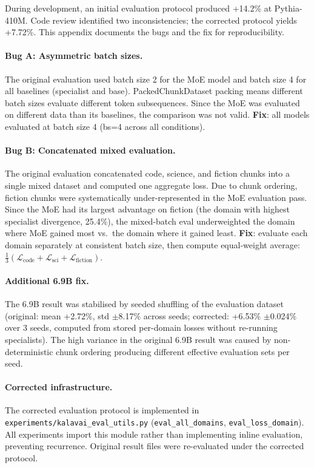 \documentclass{article}
\begin{document}
During development, an initial evaluation protocol produced +14.2\% at Pythia-410M. Code review identified two inconsistencies; the corrected protocol yields +7.72\%. This appendix documents the bugs and the fix for reproducibility.

\paragraph{Bug A: Asymmetric batch sizes.} The original evaluation used batch size 2 for the MoE model and batch size 4 for all baselines (specialist and base). PackedChunkDataset packing means different batch sizes evaluate different token subsequences. Since the MoE was evaluated on different data than its baselines, the comparison was not valid. \textbf{Fix}: all models evaluated at batch size 4 (bs=4 across all conditions).

\paragraph{Bug B: Concatenated mixed evaluation.} The original evaluation concatenated code, science, and fiction chunks into a single mixed dataset and computed one aggregate loss. Due to chunk ordering, fiction chunks were systematically under-represented in the MoE evaluation pass. Since the MoE had its largest advantage on fiction (the domain with highest specialist divergence, 25.4\%), the mixed-batch eval underweighted the domain where MoE gained most vs.\ the domain where it gained least. \textbf{Fix}: evaluate each domain separately at consistent batch size, then compute equal-weight average: $\frac{1}{3}(\mathcal{L}_\text{code} + \mathcal{L}_\text{sci} + \mathcal{L}_\text{fiction})$.

\paragraph{Additional 6.9B fix.} The 6.9B result was stabilised by seeded shuffling of the evaluation dataset (original: mean +2.72\%, std $\pm$8.17\% across seeds; corrected: +6.53\% $\pm$0.024\% over 3 seeds, computed from stored per-domain losses without re-running specialists). The high variance in the original 6.9B result was caused by non-deterministic chunk ordering producing different effective evaluation sets per seed.

\paragraph{Corrected infrastructure.} The corrected evaluation protocol is implemented in \texttt{experiments/kalavai\_eval\_utils.py} (\texttt{eval\_all\_domains}, \texttt{eval\_loss\_domain}). All experiments import this module rather than implementing inline evaluation, preventing recurrence. Original result files were re-evaluated under the corrected protocol.
\end{document}
